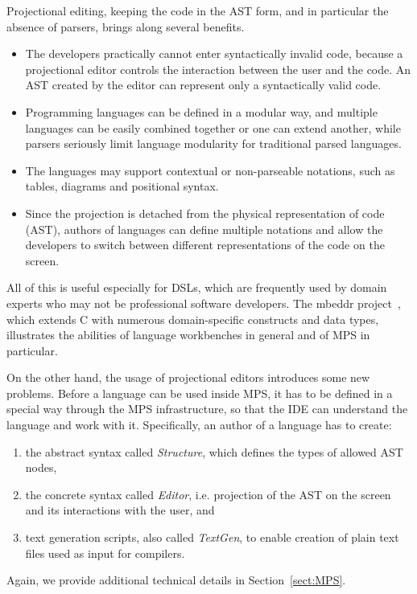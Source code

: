 Projectional editing, keeping the code in the AST form, and in particular the absence of parsers, brings along several benefits.
\begin{itemize}
	\item The developers practically cannot enter syntactically invalid code, because a projectional editor controls the interaction between the user and the code. An AST created by the editor can represent only a syntactically valid code.
	\item Programming languages can be defined in a modular way, and multiple languages can be easily combined together or one can extend another, while parsers seriously limit language modularity for traditional parsed languages.
	\item The languages may support contextual or non-parseable notations, such as tables, diagrams and positional syntax.
	\item Since the projection is detached from the physical representation of code (AST), authors of languages can define multiple notations and allow the developers to switch between different representations of the code on the screen.
\end{itemize}
All of this is useful especially for DSLs, which are frequently used by domain experts who may not be professional software developers.
The mbeddr project~\cite{ref:MBEDDR}, which extends C with numerous domain-specific constructs and data types, illustrates the abilities of language workbenches in general and of MPS in particular.

On the other hand, the usage of projectional editors introduces some new problems.
Before a language can be used inside MPS, it has to be defined in a special way through the MPS infrastructure, so that the IDE can understand the language and work with it.
Specifically, an author of a language has to create:
\begin{enumerate}
	\item the abstract syntax called \emph{Structure}, which defines the types of allowed AST nodes,
	\item the concrete syntax called \emph{Editor}, i.e. projection of the AST on the screen and its interactions with the user, and
	\item text generation scripts, also called \emph{TextGen}, to enable creation of plain text files used as input for compilers.
\end{enumerate}	
Again, we provide additional technical details in Section~\ref{sect:MPS}.

